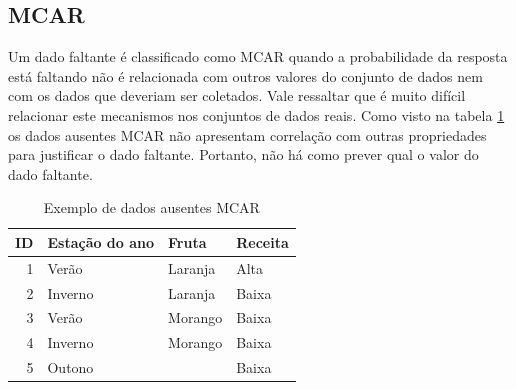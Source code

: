 \documentclass[
	12pt,				%
	openright,			%
	twoside,			%
	a4paper,			%
	english,			%
	brazil				%
	]{abntex2}
\begin{document}
		\subsection{MCAR}
			Um dado faltante é classificado como MCAR quando a probabilidade da resposta está faltando não é relacionada com outros valores do conjunto de dados nem com os dados que deveriam ser coletados. \cite{hbmissingdatameth2014}
			Vale ressaltar que é muito difícil relacionar este mecanismos nos conjuntos de dados reais. \cite{hbmissingdatameth2014} \cite{little2016missing}
			Como visto na tabela \ref{table: exemplo DA MCAR} os dados ausentes MCAR não apresentam correlação com outras propriedades para justificar o dado faltante. Portanto, não há como prever qual o valor do dado faltante.
			\begin{table}[h]
				\centering
				\caption{Exemplo de dados ausentes MCAR}
				\vspace{0.5cm}
				\label{table: exemplo DA MCAR}
				\begin{tabular}{r|lll}
				
					ID & Estação do ano & Fruta & Receita \\ %
					\hline                               %
					1 & Verão     & Laranja & Alta  \\
					2 & Inverno   & Laranja & Baixa \\
					3 & Verão     & Morango & Baixa \\
					4 & Inverno   & Morango & Baixa \\
					5 & Outono    &         & Baixa        %
				
				\end{tabular}
			\end{table}
		
\end{document}
